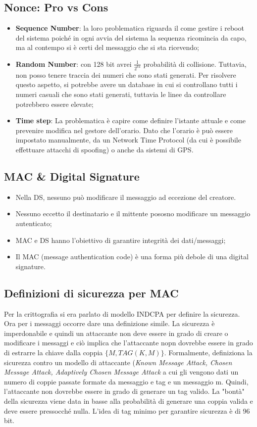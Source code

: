 \documentclass{article}
\theoremstyle{remark}
\begin{document}
\subsection{Nonce: Pro vs Cons}
\begin{itemize}
    \item \textbf{Sequence Number}: la loro problematica riguarda il come gestire i reboot del sistema poiché in ogni avvia del sistema la sequenza ricomincia da capo, ma al contempo si è certi del messaggio che si sta ricevendo;
    \item \textbf{Random Number}: con 128 bit avrei $\frac{1}{2^{64}}$ probabilità di collisione. Tuttavia, non posso tenere traccia dei numeri che sono stati generati. Per risolvere questo aspetto, si potrebbe avere un database in cui si controllano tutti i numeri casuali che sono stati generati, tuttavia le linee da controllare potrebbero essere elevate;
    \item \textbf{Time step}: La problematica è capire come definire l'istante attuale e come prevenire modifica nel gestore dell'orario. Dato che l'orario è può essere impostato manualmente, da un Network Time Protocol (da cui è possibile effettuare attacchi di spoofing) o anche da sistemi di GPS.
\end{itemize}

\subsection{MAC \& Digital Signature}
\begin{itemize}
    \item Nella DS, nessuno può modificare il messaggio ad eccezione del creatore.
    \item Nessuno eccetto il destinatario e il mittente pososno modificare un messaggio autenticato;
    \item MAC e DS hanno l'obiettivo di garantire integrità dei dati/messaggi;
    \item Il MAC (message authentication code) è una forma più debole di una digital signature.
\end{itemize}
\subsection{Definizioni di sicurezza per MAC}
Per la crittografia si era parlato di modello INDCPA per definire la sicurezza. Ora per i messaggi occorre dare una definizione simile.
La sicurezza è imperdonabile e quindi un attaccante non deve essere in grado di creare o modificare i messaggi e ciò implica che l'attaccante nopn dovrebbe essere in grado di estrarre la chiave dalla coppia $\{M,TAG(K,M)\}$.
Formalmente, definiziona la sicurezza contro un modello di attaccante (\emph{Known Message Attack, Chosen Message Attack, Adaptively Chosen Message Attack} a cui gli vengono dati un numero di coppie passate formate da messaggio e tag e un messaggio m. Quindi, l'attaccante non dovrebbe essere in grado di generare un tag valido. La "bontà" della sicurezza viene data in basse alla probabilità di generare una coppia valida e deve essere pressocché nulla.
L'idea di tag minimo per garantire sicurezza è di 96 bit.
\end{document}
